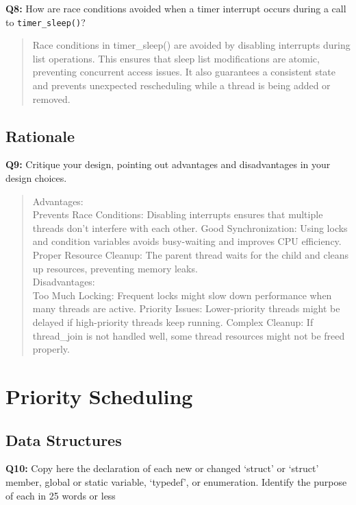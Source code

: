 \documentclass[a4paper,11pt]{paper}
\begin{document}
\textbf{Q8:} How are race conditions avoided when a timer interrupt occurs
during a call to \texttt{timer\_sleep()}?

\begin{quote}
Race conditions in timer_sleep() are avoided by disabling interrupts during list operations. This ensures that sleep list modifications are atomic, preventing concurrent access issues. It also guarantees a consistent state and prevents unexpected rescheduling while a thread is being added or removed.
\end{quote}


\subsection{Rationale}

\textbf{Q9:} Critique your design, pointing out advantages and disadvantages in
your design choices.

\begin{quote}
  Advantages:\\
    Prevents Race Conditions: Disabling interrupts ensures that multiple threads don’t interfere with each other.
    Good Synchronization: Using locks and condition variables avoids busy-waiting and improves CPU efficiency.
    Proper Resource Cleanup: The parent thread waits for the child and cleans up resources, preventing memory leaks.\\
Disadvantages:\\
    Too Much Locking: Frequent locks might slow down performance when many threads are active.
    Priority Issues: Lower-priority threads might be delayed if high-priority threads keep running.
    Complex Cleanup: If thread_join is not handled well, some thread resources might not be freed properly.
    
\end{quote}




\section{Priority Scheduling}

\subsection{Data Structures}

\textbf{Q10:} Copy here the declaration of each new or changed `struct' or
`struct' member, global or static variable, `typedef', or enumeration.  Identify
the purpose of each in 25 words or less
\end{document}
